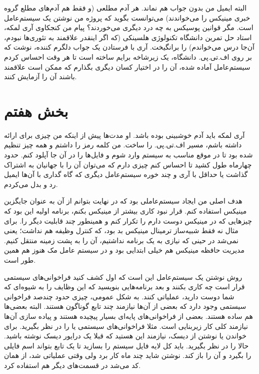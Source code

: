 البته ایمیل من بدون جواب هم نماند. هر آدم مطلعی (و فقط هم آدم‌های مطلع
گروه خبری مینیکس را می‌خواندند) می‌توانست بگوید که پروژه من نوشتن یک
سیستم‌عامل است. مگر قوانین پوسیکس به چه درد دیگری می‌خوردند؟ پیام من
کنجکاوی آری لمکه، استاد حل تمرین دانشگاه تکنولوژی
هلسینکی (که اگر اینقدر علاقمند به تئوری‌ها نبودم، آن‌جا درس می‌خواندم) را
برانگیخت. آری با فرستادن یک جواب دلگرم کننده، نوشت که بر روی
اف.تی.پی. دانشگاه، یک زیرشاخه برایم ساخته است تا هر وقت احساس کردم
سیستم‌عامل آماده شده، آن را در اختیار کسان دیگری بگذارم که ممکن است
علاقمند باشند آن را آزمایش کنند.

\section{بخش هفتم}
آری لمکه باید آدم خوشبینی بوده باشد. او مدت‌ها پیش از اینکه من چیزی
برای ارائه داشته باشم، مسیر اف.تی.پی.  را ساخت. من کلمه
رمز را داشتم و همه چیز تنظیم شده بود تا در موقع مناسب به سیستم وارد
شوم و فایل‌ها را در آن جا آپلود کنم. حدود چهارماه طول کشید تا احساس کنم
چیزی دارم که می‌توان آن را با جهانیان به اشتراک گذاشت یا حداقل با آری و
چند خوره سیستم‌عامل دیگری که گاه گداری با آن‌ها ایمیل رد و بدل می‌کردم.

هدف اصلی من ایجاد سیستم‌عاملی بود که در نهایت بتوانم از آن‌ به عنوان
جایگزین مینیکس استفاده کنم. قرار نبود کاری بیشتر از مینیکس بکنم،
برنامه اولیه این بود که چیزهایی که در مینیکس دوست دارم را تکرار کنم و
همینطور چند قابلیت دیگر را. برای مثال نه فقط شبیه‌ساز ترمینال مینیکس بد
بود، که کنترل وظیفه هم نداشت؛ یعنی نمی‌شد در حینی که نیازی به یک برنامه
نداشتیم، آن را به پشت زمینه منتقل کنیم. مدیریت حافظه مینیکس هم خیلی
ابتدایی بود و در سیستم عامل مک هنوز هم همین طور است.

روش نوشتن یک سیستم‌عامل این است که اول کشف کنید فراخوانی‌های سیستمی قرار
است چه کاری بکنند و بعد برنامه‌هایی بنویسید که این وظایف را به شیوه‌ای
که شما دوست دارید، عملیاتی کنند. به شکل عمومی، چیزی حدود چندصد
فراخوانی سیستمی وجود دارد که بعضی از آن‌ها نیازمند چند تابع گوناگون
هستند. البته بعضی‌ها هم ساده هستند. بعضی از فراخوانی‌های پایه‌ای بسیار
پیچیده هستند و پیاده سازی آن‌ها نیازمند کلی کار زیربنایی است. مثلا
فراخوانی‌های سیستمی  یا  را در نظر
بگیرید. برای خواندن یا نوشتن از دیسک، نیازمند این هستید که قبلا یک
درایور دیسک نوشته باشید. حالا  را در نظر
بگیرید. باید کل لایه فایل سیستم را بسازید تا یک تابع بتواند اسم فایلی
را بگیرد و آن را باز کند. نوشتن  شاید چند ماه کار
برد ولی وقتی عملیاتی شد، از همان کد می‌شد در قسمت‌های دیگر هم استفاده
کرد.

